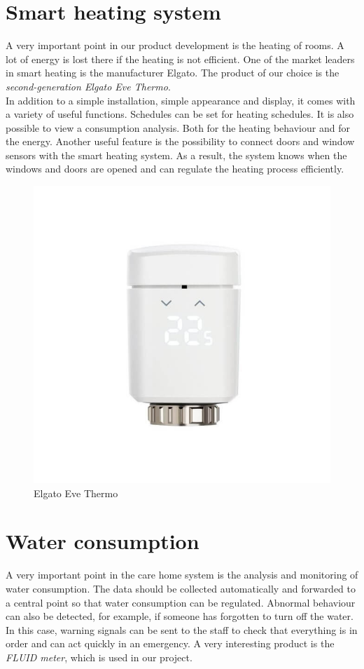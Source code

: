 \section{Smart heating system}
\label{sec:smartHeating}
A very important point in our product development is the heating of rooms. A lot of energy is lost there if the heating is not efficient. One of the market leaders in smart heating is the manufacturer Elgato. The product of our choice is the \textit{second-generation Elgato Eve Thermo}. 
\\
In addition to a simple installation, simple appearance and display, it comes with a variety of useful functions. Schedules can be set for heating schedules. It is also possible to view a consumption analysis. Both for the heating behaviour and for the energy. Another useful feature is the possibility to connect doors and window sensors with the smart heating system. As a result, the system knows when the windows and doors are opened and can regulate the heating process efficiently.
\newpage
\begin{figure}[h]
	\centering
	\includegraphics[width=.5\textwidth, trim=0 3cm 0 3cm, clip]{images/CostAnalysis/elgato-eve-thermo} 
	\caption{Elgato Eve Thermo}
	\label{fig:elgatoEve}
\end{figure}

\section{Water consumption}
A very important point in the care home system is the analysis and monitoring of water consumption. The data should be collected automatically and forwarded to a central point so that water consumption can be regulated. Abnormal behaviour can also be detected, for example, if someone has forgotten to turn off the water. In this case, warning signals can be sent to the staff to check that everything is in order and can act quickly in an emergency. A very interesting product is the \textit{FLUID meter}, which is used in our project.

